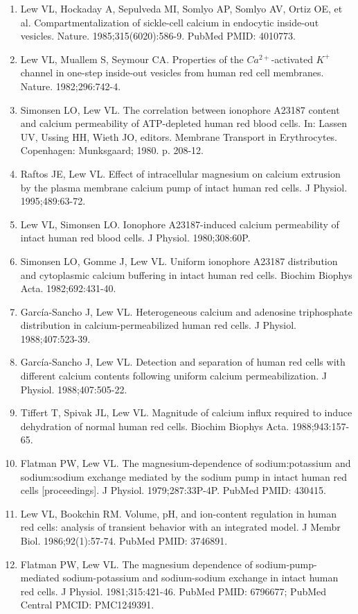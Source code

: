 \documentclass[a4paper]{article}
\begin{document}
\begin{enumerate}
\item Lew VL, Hockaday A, Sepulveda MI, Somlyo AP, Somlyo AV, Ortiz OE, et al. Compartmentalization of sickle-cell calcium in endocytic inside-out vesicles. Nature. 1985;315(6020):586-9. PubMed PMID: 4010773.
\item Lew VL, Muallem S, Seymour CA. Properties of the $Ca^{2+}$-activated $K^+$ channel in one-step inside-out vesicles from human red cell membranes. Nature. 1982;296:742-4.
\item Simonsen LO, Lew VL. The correlation between ionophore A23187 content and calcium permeability of ATP-depleted human red blood cells. In: Lassen UV, Ussing HH, Wieth JO, editors. Membrane Transport in Erythrocytes. Copenhagen: Munksgaard; 1980. p. 208-12.
\item Raftos JE, Lew VL. Effect of intracellular magnesium on calcium extrusion by the plasma membrane calcium pump of intact human red cells. J Physiol. 1995;489:63-72.
\item Lew VL, Simonsen LO. Ionophore A23187-induced calcium permeability of intact human red blood cells. J Physiol. 1980;308:60P.
\item Simonsen LO, Gomme J, Lew VL. Uniform ionophore A23187 distribution and cytoplasmic calcium buffering in intact human red cells. Biochim Biophys Acta. 1982;692:431-40.
\item García-Sancho J, Lew VL. Heterogeneous calcium and adenosine triphosphate distribution in calcium-permeabilized human red cells. J Physiol. 1988;407:523-39.
\item García-Sancho J, Lew VL. Detection and separation of human red cells with different calcium contents following uniform calcium permeabilization. J Physiol. 1988;407:505-22.
\item Tiffert T, Spivak JL, Lew VL. Magnitude of calcium influx required to induce dehydration of normal human red cells. Biochim Biophys Acta. 1988;943:157-65.
\item Flatman PW, Lew VL. The magnesium-dependence of sodium:potassium and sodium:sodium exchange mediated by the sodium pump in intact human red cells [proceedings]. J Physiol. 1979;287:33P-4P. PubMed PMID: 430415.
\item Lew VL, Bookchin RM. Volume, pH, and ion-content regulation in human red cells: analysis of transient behavior with an integrated model. J Membr Biol. 1986;92(1):57-74. PubMed PMID: 3746891.
\item Flatman PW, Lew VL. The magnesium dependence of sodium-pump-mediated sodium-potassium and sodium-sodium exchange in intact human red cells. J Physiol. 1981;315:421-46. PubMed PMID: 6796677; PubMed Central PMCID: PMC1249391.
\end{enumerate}
\end{document}
